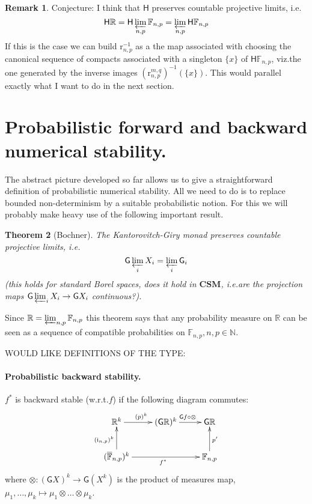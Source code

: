 \documentclass[10pt,a4paper]{article}
\theoremstyle{plain}
\newtheorem{theorem}{Theorem}
\theoremstyle{definition}
\newtheorem{remark}[theorem]{Remark}
\newcommand{\CSM}{\mathbf{CSM}}
\newcommand{\F}[1][n,p]{\mathbb{F}_{#1}}
\newcommand{\Ff}[1][n,p]{\overline{\mathbb{F}}_{#1}}
\newcommand{\N}{\mathbb{N}}
\newcommand{\R}{\mathbb{R}}
\newcommand{\Rep}[1][n,p]{\mathrm{i}_{#1}}
\newcommand{\Round}[1][n,p]{\mathrm{r}_{#1}}
\newcommand{\Haus}{\mathsf{H}}
\newcommand{\Giry}{\mathsf{G}}
\newcommand{\inv}{^{-1}}
\begin{document}
\begin{remark}
Conjecture: I think that $\Haus$ preserves countable projective limits, i.e.
\[
\Haus \R=\Haus \varprojlim_{n,p}\F=\varprojlim_{n,p}\Haus\F
\]
If this is the case we can build $\Round\inv$ as a the map associated with choosing the canonical sequence of compacts associated with a singleton $\{x\}$ of $\Haus\F$, viz.\@ the one generated by the inverse images $(\Round^{m,q})\inv(\{x\})$. This would parallel exactly what I want to do in the next section.
\end{remark}

\section{Probabilistic forward and backward numerical stability.}
The abstract picture developed so far allows us to give a straightforward definition of probabilistic numerical stability. All we need to do is to replace bounded non-determinism by a suitable probabilistic notion. For this we will probably make heavy use of the following important result.

\begin{theorem}[Bochner]
The Kantorovitch-Giry monad preserves countable projective limits, i.e.
\[
\Giry \varprojlim_{i} X_i=\varprojlim_{i} \Giry _i
\]
(this holds for standard Borel spaces, does it hold in $\CSM$, i.e.\@ are the projection maps $\Giry \varprojlim_{i} X_i\to\Giry X_i$ continuous?). 
\end{theorem}

Since $\R=\varprojlim_{n,p}\F$ this theorem says that any probability measure on $\R$ can be seen as a sequence of compatible probabilities on $\F, n,p\in\N$. 


\vspace{1em}
WOULD LIKE DEFINITIONS OF THE TYPE:

\newcommand{\pro}[1][n,p]{p}
\newcommand{\prob}{p'}

\paragraph{Probabilistic backward stability.} $f^\ast$ is backward stable (w.r.t.\@ $f$) if the following diagram commutes:
\begin{equation}\label{diag:backpro}
\xymatrix
{
\R^k\ar[r]^{(\pro)^k} & (\Giry\R)^k\ar[r]^{\Giry f\circ \otimes} & \Giry \R\\
(\Ff)^k\ar[rr]_{f^\ast}\ar[u]^{(\Rep)^k} & & \F\ar[u]_{\prob}
}
\end{equation}
where $\otimes: (\Giry X)^k\to\Giry (X^k)$ is the product of measures map, $\mu_1,\ldots,\mu_k\mapsto \mu_1\otimes \ldots\otimes \mu_k$.
\end{document}
